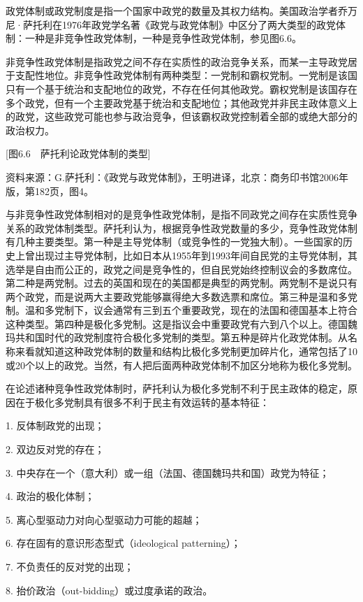 
政党体制或政党制度是指一个国家中政党的数量及其权力结构。美国政治学者乔万尼·萨托利在1976年政党学名著《政党与政党体制》中区分了两大类型的政党体制：一种是非竞争性政党体制，一种是竞争性政党体制，参见图6.6。

非竞争性政党体制是指政党之间不存在实质性的政治竞争关系，而某一主导政党居于支配性地位。非竞争性政党体制有两种类型：一党制和霸权党制。一党制是该国只有一个基于统治和支配地位的政党，不存在任何其他政党。霸权党制是该国存在多个政党，但有一个主要政党基于统治和支配地位；其他政党并非民主政体意义上的政党，这些政党可能也参与政治竞争，但该霸权政党控制着全部的或绝大部分的政治权力。

[图6.6　萨托利论政党体制的类型]

资料来源：G.萨托利：《政党与政党体制》，王明进译，北京：商务印书馆2006年版，第182页，图4。

与非竞争性政党体制相对的是竞争性政党体制，是指不同政党之间存在实质性竞争关系的政党体制类型。萨托利认为，根据竞争性政党数量的多少，竞争性政党体制有几种主要类型。第一种是主导党体制（或竞争性的一党独大制）。一些国家的历史上曾出现过主导党体制，比如日本从1955年到1993年间自民党的主导党体制，其选举是自由而公正的，政党之间是竞争性的，但自民党始终控制议会的多数席位。第二种是两党制。过去的英国和现在的美国都是典型的两党制。两党制不是说只有两个政党，而是说两大主要政党能够赢得绝大多数选票和席位。第三种是温和多党制。温和多党制下，议会通常有三到五个重要政党，现在的法国和德国基本上符合这种类型。第四种是极化多党制。这是指议会中重要政党有六到八个以上。德国魏玛共和国时代的政党制度符合极化多党制的类型。第五种是碎片化政党体制。从名称来看就知道这种政党体制的数量和结构比极化多党制更加碎片化，通常包括了10或20个以上的政党。当然，有人把后面两种政党体制不加区分地称为极化多党制。

在论述诸种竞争性政党体制时，萨托利认为极化多党制不利于民主政体的稳定，原因在于极化多党制具有很多不利于民主有效运转的基本特征：

1. 反体制政党的出现；

2. 双边反对党的存在；

3. 中央存在一个（意大利）或一组（法国、德国魏玛共和国）政党为特征；

4. 政治的极化体制；

5. 离心型驱动力对向心型驱动力可能的超越；

6. 存在固有的意识形态型式（ideological patterning）；

7. 不负责任的反对党的出现；

8. 抬价政治（out-bidding）或过度承诺的政治。


